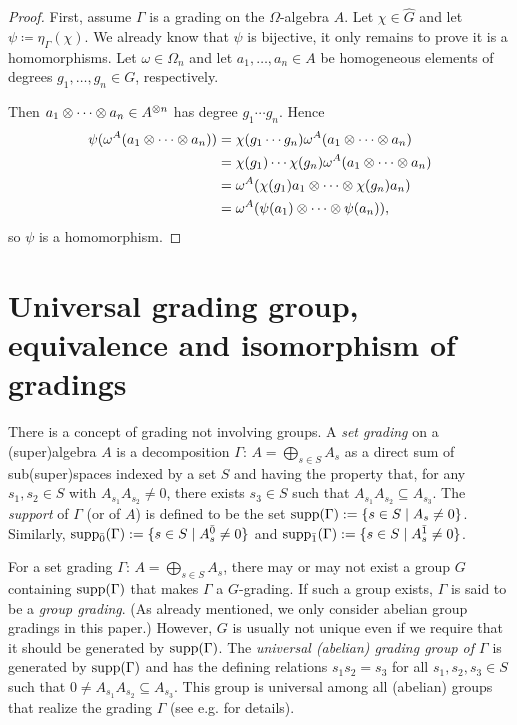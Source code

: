 \begin{proof}
    First, assume $\Gamma$ is a grading on the $\Omega$-algebra $A$.
    Let $\chi \in \widehat G$ and let $\psi \coloneqq \eta_\Gamma(\chi)$. 
    We already know that $\psi$ is bijective, it only remains to prove it is a homomorphisms. 
    Let $\omega \in \Omega_n$ and let $a_1, \ldots, a_n \in A$ be homogeneous elements of degrees $g_1, \ldots, g_n \in G$, respectively.
    
    Then $a_1\otimes \cdots \otimes a_n \in A^{\otimes n}$ has degree $g_1 \cdots g_n$. Hence
    \begin{align*}
        \psi(\omega^A(a_1\otimes \cdots \otimes a_n)) &= \chi(g_1 \cdots g_n) \omega^A(a_1\otimes \cdots \otimes a_n)\\
        &=\chi(g_1) \cdots \chi(g_n) \omega^A(a_1\otimes \cdots \otimes a_n)\\
        &= \omega^A(\chi(g_1)a_1\otimes \cdots \otimes \chi(g_n)a_n)\\
        &= \omega^A(\psi(a_1)\otimes \cdots \otimes \psi(a_n)),
    \end{align*}
    so $\psi$ is a homomorphism.
\end{proof}

\section{Universal grading group, equivalence and isomorphism of gradings}\label{ssec:universal_group}

There is a concept of grading not involving groups. A \emph{set grading} on a (super)algebra $A$ is a decomposition $\Gamma:\,A=\bigoplus_{s\in S}A_s$ as a direct sum of sub\-(su\-per)\-spa\-ces indexed by a set $S$ and having the property that, for any $s_1,s_2\in S$ with $A_{s_1}A_{s_2}\ne 0$, there exists $s_3\in S$ such that $A_{s_1}A_{s_2}\subseteq A_{s_3}$. The \emph{support} of $\Gamma$ (or of $A$) is defined to be the set $\operatorname{supp}(\Gamma) := \{s\in S \mid A_s \neq 0\}$.
Similarly, $\operatorname{supp}_{\bar{0}}(\Gamma) := \{s\in S \mid A_s^{\bar{0}} \neq 0\}$ and $\operatorname{supp}_{\bar{1}}(\Gamma) := \{s\in S \mid A_s^{\bar{1}} \neq 0\}$.

For a set grading $\Gamma:\,A=\bigoplus_{s\in S}A_s$, there may or may not exist a group $G$ containing $\operatorname{supp}(\Gamma)$ that makes $\Gamma$ a $G$-grading. 
If such a group exists, $\Gamma$ is said to be a {\em group grading}. (As already mentioned, we only consider abelian group gradings in this paper.) 
However, $G$ is usually not unique even if we require that it should be generated by $\operatorname{supp}(\Gamma)$. 
The {\em universal (abelian) grading group of $\Gamma$} \cite{PZ} is generated by $\operatorname{supp}(\Gamma)$ and has the defining relations 
$s_1s_2=s_3$ for all $s_1,s_2,s_3\in S$ such that $0\neq A_{s_1}A_{s_2}\subseteq A_{s_3}$. 
This group is universal among all (abelian) groups that realize the grading $\Gamma$ (see e.g. \cite[Chapter 1]{livromicha} for details).

